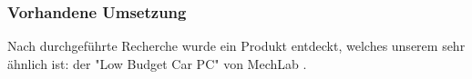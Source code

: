 \subsubsection{Vorhandene Umsetzung}
\label{subsec:Vorhandene Umsetzung}
Nach durchgeführte Recherche wurde ein Produkt entdeckt, welches unserem sehr ähnlich ist: der "Low Budget Car PC" von MechLab \cite{MechLab-Enineering}.
